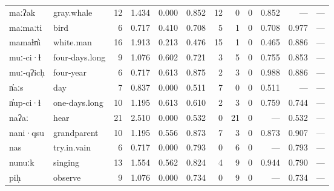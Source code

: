 \begin{landscape}
\begin{longtable}[c]{ l l | r r c c | r r r | r r r }
  maːʔak             & gray.whale                & 12  & 1.434                     & 0.000           & 0.852      & 12        & 0           & 0            & 0.852     & —           & —\\
  maːmaːti           & bird                      & 6   & 0.717                     & 0.410           & 0.708      & 5         & 1           & 0            & 0.708     & 0.977       & —\\
  mamaɬn̓i            & white.man                 & 16  & 1.913                     & 0.213           & 0.476      & 15        & 1           & 0            & 0.465     & 0.886       & —\\
  muː‑ci·ɬ           & four‑days.long            & 9   & 1.076                     & 0.602           & 0.721      & 3         & 5           & 0            & 0.755     & 0.853       & —\\
  muː‑qʔicḥ          & four‑year                 & 6   & 0.717                     & 0.613           & 0.875      & 2         & 3           & 0            & 0.988     & 0.886       & —\\
  n̓aːs               & day                       & 7   & 0.837                     & 0.000           & 0.511      & 7         & 0           & 0            & 0.511     & —           & —\\
  n̓up‑ci·ɬ           & one‑days.long             & 10  & 1.195                     & 0.613           & 0.610      & 2         & 3           & 0            & 0.759     & 0.744       & —\\
  naʔaː              & hear                      & 21  & 2.510                     & 0.000           & 0.532      & 0         & 21          & 0            & —         & 0.532       & —\\
  nani·qsu           & grandparent               & 10  & 1.195                     & 0.556           & 0.873      & 7         & 3           & 0            & 0.873     & 0.907       & —\\
  nas                & try.in.vain               & 6   & 0.717                     & 0.000           & 0.793      & 0         & 6           & 0            & —         & 0.793       & —\\
  nunuːk             & singing                   & 13  & 1.554                     & 0.562           & 0.824      & 4         & 9           & 0            & 0.944     & 0.790       & —\\
  piḥ                & observe                   & 9   & 1.076                     & 0.000           & 0.734      & 0         & 9           & 0            & —         & 0.734       & —\\

\end{longtable}
\end{landscape}
